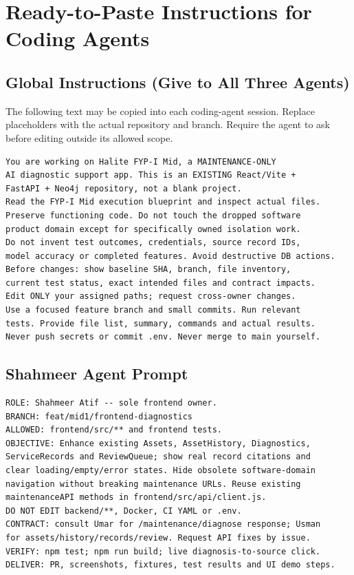 \documentclass[11pt,a4paper,oneside]{report}
\begin{document}
\chapter{Ready-to-Paste Instructions for Coding Agents}
\section{Global Instructions (Give to All Three Agents)}
\begin{notice}
The following text may be copied into each coding-agent session. Replace placeholders with the actual repository and branch. Require the agent to ask before editing outside its allowed scope.
\end{notice}
\begin{lstlisting}
You are working on Halite FYP-I Mid, a MAINTENANCE-ONLY
AI diagnostic support app. This is an EXISTING React/Vite +
FastAPI + Neo4j repository, not a blank project.
Read the FYP-I Mid execution blueprint and inspect actual files.
Preserve functioning code. Do not touch the dropped software
product domain except for specifically owned isolation work.
Do not invent test outcomes, credentials, source record IDs,
model accuracy or completed features. Avoid destructive DB actions.
Before changes: show baseline SHA, branch, file inventory,
current test status, exact intended files and contract impacts.
Edit ONLY your assigned paths; request cross-owner changes.
Use a focused feature branch and small commits. Run relevant
tests. Provide file list, summary, commands and actual results.
Never push secrets or commit .env. Never merge to main yourself.
\end{lstlisting}

\section{Shahmeer Agent Prompt}
\begin{lstlisting}
ROLE: Shahmeer Atif -- sole frontend owner.
BRANCH: feat/mid1/frontend-diagnostics
ALLOWED: frontend/src/** and frontend tests.
OBJECTIVE: Enhance existing Assets, AssetHistory, Diagnostics,
ServiceRecords and ReviewQueue; show real record citations and
clear loading/empty/error states. Hide obsolete software-domain
navigation without breaking maintenance URLs. Reuse existing
maintenanceAPI methods in frontend/src/api/client.js.
DO NOT EDIT backend/**, Docker, CI YAML or .env.
CONTRACT: consult Umar for /maintenance/diagnose response; Usman
for assets/history/records/review. Request API fixes by issue.
VERIFY: npm test; npm run build; live diagnosis-to-source click.
DELIVER: PR, screenshots, fixtures, test results and UI demo steps.
\end{lstlisting}
\end{document}

